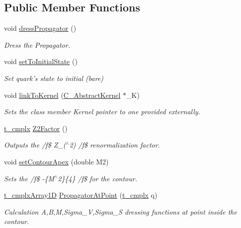 \subsection*{Public Member Functions}
\begin{DoxyCompactItemize}
\item 
void \hyperlink{class_c___quark_a9ab0f782b3d722eea50544e1101c00c5}{dress\-Propagator} ()
\begin{DoxyCompactList}\small\item\em Dress the Propagator. \end{DoxyCompactList}\item 
void \hyperlink{class_c___quark_afe212ef0b9b354ce78670323f3110633}{set\-To\-Initial\-State} ()
\begin{DoxyCompactList}\small\item\em Set quark's state to initial (bare) \end{DoxyCompactList}\item 
void \hyperlink{class_c___quark_aea358bb9c82c6e62d99c69893cc35cf9}{link\-To\-Kernel} (\hyperlink{class_c___abstract_kernel}{C\-\_\-\-Abstract\-Kernel} $\ast$\-\_\-\-K)
\begin{DoxyCompactList}\small\item\em Sets the class member Kernel pointer to one provided externally. \end{DoxyCompactList}\item 
\hyperlink{types_8h_aa75ae339052372f671bb263e6a272e82}{t\-\_\-cmplx} \hyperlink{class_c___quark_a71b08f07b27da3df956536858238ec14}{Z2\-Factor} ()
\begin{DoxyCompactList}\small\item\em Outputs the /f\$ Z\-\_($^\wedge$2) /f\$ renormalization factor. \end{DoxyCompactList}\item 
void \hyperlink{class_c___quark_a1065f0f828e3d7766c8c04f83277d77b}{set\-Contour\-Apex} (double M2)
\begin{DoxyCompactList}\small\item\em Sets the /f\$ -\/\{M$^\wedge$2\}\{4\} /f\$ for the contour. \end{DoxyCompactList}\item 
\hyperlink{types_8h_aab52f79903881ec15d289b3dbfb102fd}{t\-\_\-cmplx\-Array1\-D} \hyperlink{class_c___quark_a3d1f0eafbded04e910a6576e6a9a079a}{Propagator\-At\-Point} (\hyperlink{types_8h_aa75ae339052372f671bb263e6a272e82}{t\-\_\-cmplx} q)
\begin{DoxyCompactList}\small\item\em Calculation A,B,M,Sigma\-\_\-\-V,Sigma\-\_\-\-S dressing functions at point inside the contour. \end{DoxyCompactList}\item 

\end{DoxyCompactItemize}
